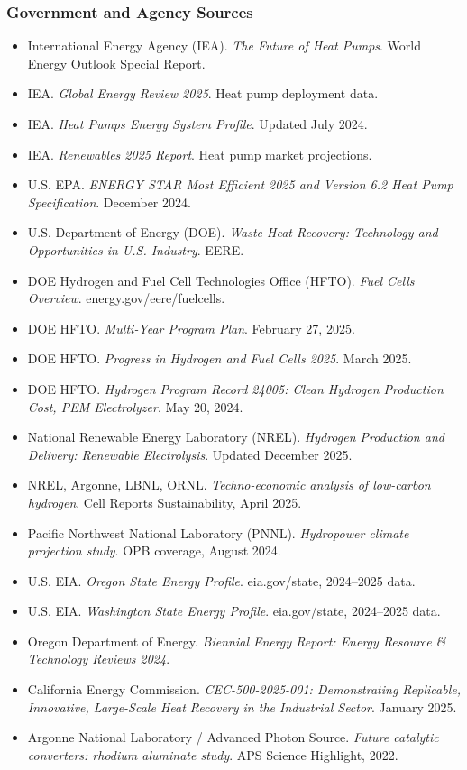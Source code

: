 \documentclass[11pt,letterpaper]{article}
\begin{document}
\subsubsection{Government and Agency Sources}
\begin{itemize}
  \item International Energy Agency (IEA). \textit{The Future of Heat Pumps}. World Energy Outlook Special Report.
  \item IEA. \textit{Global Energy Review 2025}. Heat pump deployment data.
  \item IEA. \textit{Heat Pumps Energy System Profile}. Updated July 2024.
  \item IEA. \textit{Renewables 2025 Report}. Heat pump market projections.
  \item U.S. EPA. \textit{ENERGY STAR Most Efficient 2025 and Version 6.2 Heat Pump Specification}. December 2024.
  \item U.S. Department of Energy (DOE). \textit{Waste Heat Recovery: Technology and Opportunities in U.S. Industry}. EERE.
  \item DOE Hydrogen and Fuel Cell Technologies Office (HFTO). \textit{Fuel Cells Overview}. energy.gov/eere/fuelcells.
  \item DOE HFTO. \textit{Multi-Year Program Plan}. February 27, 2025.
  \item DOE HFTO. \textit{Progress in Hydrogen and Fuel Cells 2025}. March 2025.
  \item DOE HFTO. \textit{Hydrogen Program Record 24005: Clean Hydrogen Production Cost, PEM Electrolyzer}. May 20, 2024.
  \item National Renewable Energy Laboratory (NREL). \textit{Hydrogen Production and Delivery: Renewable Electrolysis}. Updated December 2025.
  \item NREL, Argonne, LBNL, ORNL. \textit{Techno-economic analysis of low-carbon hydrogen}. Cell Reports Sustainability, April 2025.
  \item Pacific Northwest National Laboratory (PNNL). \textit{Hydropower climate projection study}. OPB coverage, August 2024.
  \item U.S. EIA. \textit{Oregon State Energy Profile}. eia.gov/state, 2024--2025 data.
  \item U.S. EIA. \textit{Washington State Energy Profile}. eia.gov/state, 2024--2025 data.
  \item Oregon Department of Energy. \textit{Biennial Energy Report: Energy Resource \& Technology Reviews 2024}.
  \item California Energy Commission. \textit{CEC-500-2025-001: Demonstrating Replicable, Innovative, Large-Scale Heat Recovery in the Industrial Sector}. January 2025.
  \item Argonne National Laboratory / Advanced Photon Source. \textit{Future catalytic converters: rhodium aluminate study}. APS Science Highlight, 2022.
\end{itemize}
\end{document}
